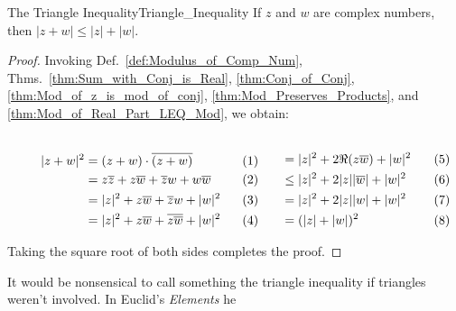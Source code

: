     \begin{ltheorem}{The Triangle Inequality}{Triangle_Inequality}
        If $z$ and $w$ are complex numbers, then $|z+w|\leq|z|+|w|$.
    \end{ltheorem}
    \begin{proof}
        Invoking Def.~\ref{def:Modulus_of_Comp_Num},
        Thms.~\ref{thm:Sum_with_Conj_is_Real}, \ref{thm:Conj_of_Conj},
        \ref{thm:Mod_of_z_is_mod_of_conj},
        \ref{thm:Mod_Preserves_Products}, and
        \ref{thm:Mod_of_Real_Part_LEQ_Mod}, we obtain:
        \par
        \begin{subequations}
            \begin{minipage}[b]{0.55\textwidth}
                \centering
                \begin{align}
                    |z+w|^{2}&=(z+w)\cdot\overline{(z+w)}\\
                             &=z\overline{z}+z\overline{w}+\overline{z}w
                                            +w\overline{w}\\
                             &=|z|^{2}+z\overline{w}
                                      +\overline{z}w+|w|^{2}\\
                             &=|z|^{2}+z\overline{w}
                                      +\overline{z\overline{w}}+|w|^{2}
                \end{align}
            \end{minipage}
            \hfill
            \begin{minipage}[b]{0.44\textwidth}
                \centering
                \begin{align}
                    &=|z|^{2}+2\Re(z\overline{w})+|w|^{2}\\
                    &\leq|z|^{2}+2|z||\overline{w}|+|w|^{2}\\
                    &=|z|^{2}+2|z||w|+|w|^{2}\\
                    &=(|z|+|w|)^{2}
                \end{align}
            \end{minipage}
        \end{subequations}
        \par
        \vspace{2.5ex}
        Taking the square root of both sides completes the proof.
    \end{proof}
    It would be nonsensical to call something the triangle inequality
    if triangles weren't involved. In Euclid's \textit{Elements} he
